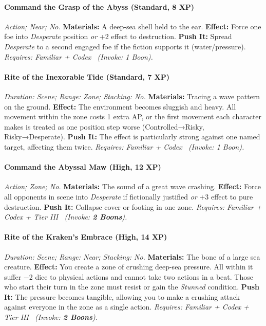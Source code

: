 \documentclass[12pt,twoside]{book}
\begin{document}
\paragraph{Command the Grasp of the Abyss (Standard, 8 XP)} \emph{Action; Near; No.}
\textbf{Materials:} A deep-sea shell held to the ear.
\textbf{Effect:} Force one foe into \emph{Desperate} position \emph{or} +2 effect to destruction.
\textbf{Push It:} Spread \emph{Desperate} to a second engaged foe if the fiction supports it (water/pressure).
\emph{Requires: Familiar + Codex \ (\textit{Invoke:} 1 Boon).}
\paragraph{Rite of the Inexorable Tide (Standard, 7 XP)} \emph{Duration: Scene; Range: Zone; Stacking: No.}
\textbf{Materials:} Tracing a wave pattern on the ground.
\textbf{Effect:} The environment becomes sluggish and heavy. All movement within the zone costs 1 extra AP, or the first movement each character makes is treated as one position step worse (Controlled→Risky, Risky→Desperate).
\textbf{Push It:} The effect is particularly strong against one named target, affecting them twice.
\emph{Requires: Familiar + Codex \ (\textit{Invoke:} 1 Boon).}
\paragraph{Command the Abyssal Maw (High, 12 XP)} \emph{Action; Zone; No.}
\textbf{Materials:} The sound of a great wave crashing.
\textbf{Effect:} Force all opponents in scene into \emph{Desperate} if fictionally justified \emph{or} +3 effect to pure destruction.
\textbf{Push It:} Collapse cover or footing in one zone.
\emph{Requires: Familiar + Codex + Tier III \ (\textit{Invoke:} \textbf{2 Boons}).}
\paragraph{Rite of the Kraken's Embrace (High, 14 XP)} \emph{Duration: Scene; Range: Near; Stacking: No.}
\textbf{Materials:} The bone of a large sea creature.
\textbf{Effect:} You create a zone of crushing deep-sea pressure. All within it suffer −2 dice to physical actions and cannot take two actions in a beat. Those who start their turn in the zone must resist or gain the \emph{Stunned} condition.
\textbf{Push It:} The pressure becomes tangible, allowing you to make a crushing attack against everyone in the zone as a single action.
\emph{Requires: Familiar + Codex + Tier III \ (\textit{Invoke:} \textbf{2 Boons}).}
\end{document}
